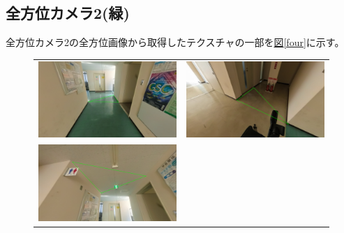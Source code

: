 \documentclass[]{jarticle}          %
\begin{document}
\subsection{全方位カメラ2(緑)}
全方位カメラ2の全方位画像から取得したテクスチャの一部を\hyperref[four]{図\ref{four}}に示す。
\begin{figure}[H]
  \begin{center}
    \begin{tabular}{cc}
      \includegraphics[keepaspectratio, scale=0.08]{figures/texture1/texture_1_0.png}&
      \includegraphics[keepaspectratio, scale=0.08]{figures/texture1/texture_1_5.png}\\
      \includegraphics[keepaspectratio, scale=0.08]{figures/texture1/texture_1_10.png}&

\end{tabular}
\end{center}
\end{figure}
\end{document}
